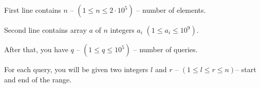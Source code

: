 First line contains $n$ -- $(1\le n \le 2 \cdot 10^5 )$ -- number of elements.

Second line contains array $a$ of $n$ integers $a_i$ $(1 \le a_i \le 10^9)$.

After that, you have $q$ -- $(1\le q \le 10^5)$ -- number of queries.

For each query, you will be given two integers $l$ and $ r$ -- $(1\le l \le r\le n)$-- start and end of the range.
